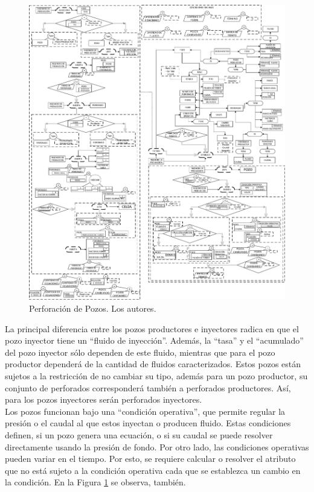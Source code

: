 \begin{figure}[h]
	\centering%
	\includegraphics[width=0.9\linewidth]{Fig/Pozo.pdf}%
	\caption[Perforación de Pozos.]{Perforación de Pozos. Los autores.} \label{fig:Well}
\end{figure}

La principal diferencia entre los pozos productores e inyectores radica en que el pozo inyector tiene un ``fluido de inyección''. Además, la ``tasa'' y el ``acumulado'' del pozo inyector sólo dependen de este fluido, mientras que para el pozo productor dependerá de la cantidad de fluidos caracterizados. Estos pozos están sujetos a la restricción de no cambiar su tipo, además para un pozo productor, su conjunto de perforados corresponderá también a perforados productores. Así, para los pozos inyectores serán perforados inyectores.\\

Los pozos funcionan bajo una ``condición operativa'', que permite regular la presión o el caudal al que estos inyectan o producen fluido. Estas condiciones definen, si un pozo genera una ecuación, o si su caudal se puede resolver directamente usando la presión de fondo. Por otro lado, las condiciones operativas pueden variar en el tiempo. Por esto, se requiere calcular o resolver el atributo que no está sujeto a la condición operativa cada que se establezca un cambio en la condición. En la Figura \ref{fig:Well} se observa, también.

